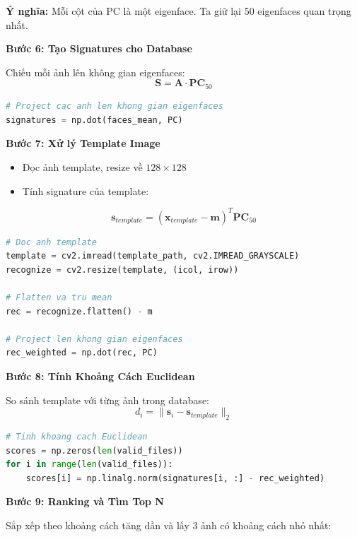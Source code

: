 \textbf{Ý nghĩa:} Mỗi cột của PC là một eigenface. Ta giữ lại 50 eigenfaces quan trọng nhất.

\textbf{Bước 6: Tạo Signatures cho Database}

Chiếu mỗi ảnh lên không gian eigenfaces:
\begin{equation}
    \mathbf{S} = \mathbf{A} \cdot \mathbf{PC}_{50}
\end{equation}

\begin{lstlisting}[language=Python]
# Project cac anh len khong gian eigenfaces
signatures = np.dot(faces_mean, PC)
\end{lstlisting}

\textbf{Bước 7: Xử lý Template Image}

\begin{itemize}
    \item Đọc ảnh template, resize về $128 \times 128$
    \item Tính signature của template:
\end{itemize}
\begin{equation}
    \mathbf{s}_{template} = (\mathbf{x}_{template} - \mathbf{m})^T \mathbf{PC}_{50}
\end{equation}

\begin{lstlisting}[language=Python]
# Doc anh template
template = cv2.imread(template_path, cv2.IMREAD_GRAYSCALE)
recognize = cv2.resize(template, (icol, irow))

# Flatten va tru mean
rec = recognize.flatten() - m

# Project len khong gian eigenfaces
rec_weighted = np.dot(rec, PC)
\end{lstlisting}

\textbf{Bước 8: Tính Khoảng Cách Euclidean}

So sánh template với từng ảnh trong database:
\begin{equation}
    d_i = \|\mathbf{s}_i - \mathbf{s}_{template}\|_2
\end{equation}

\begin{lstlisting}[language=Python]
# Tinh khoang cach Euclidean
scores = np.zeros(len(valid_files))
for i in range(len(valid_files)):
    scores[i] = np.linalg.norm(signatures[i, :] - rec_weighted)
\end{lstlisting}

\textbf{Bước 9: Ranking và Tìm Top N}

Sắp xếp theo khoảng cách tăng dần và lấy 3 ảnh có khoảng cách nhỏ nhất:

